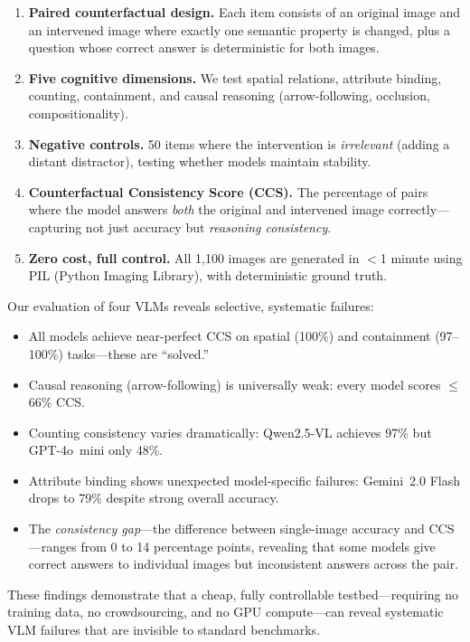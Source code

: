 \documentclass[10pt,twocolumn,letterpaper]{article}
\newcommand{\ccs}{CCS\xspace}
\begin{document}
\begin{enumerate}
\setlength\itemsep{0pt}
\item \textbf{Paired counterfactual design.} Each item consists of an original image and an intervened image where exactly one semantic property is changed, plus a question whose correct answer is deterministic for both images.
\item \textbf{Five cognitive dimensions.} We test spatial relations, attribute binding, counting, containment, and causal reasoning (arrow-following, occlusion, compositionality).
\item \textbf{Negative controls.} 50 items where the intervention is \emph{irrelevant} (adding a distant distractor), testing whether models maintain stability.
\item \textbf{Counterfactual Consistency Score (\ccs).} The percentage of pairs where the model answers \emph{both} the original and intervened image correctly---capturing not just accuracy but \emph{reasoning consistency}.
\item \textbf{Zero cost, full control.} All 1,100 images are generated in $<$1 minute using PIL (Python Imaging Library), with deterministic ground truth.
\end{enumerate}

Our evaluation of four VLMs reveals selective, systematic failures:
\begin{itemize}
\setlength\itemsep{0pt}
\item All models achieve near-perfect \ccs on spatial (100\%) and containment (97--100\%) tasks---these are ``solved.''
\item Causal reasoning (arrow-following) is universally weak: every model scores $\leq$66\% \ccs.
\item Counting consistency varies dramatically: Qwen2.5-VL achieves 97\% but GPT-4o~mini only 48\%.
\item Attribute binding shows unexpected model-specific failures: Gemini~2.0 Flash drops to 79\% despite strong overall accuracy.
\item The \emph{consistency gap}---the difference between single-image accuracy and \ccs---ranges from 0 to 14 percentage points, revealing that some models give correct answers to individual images but inconsistent answers across the pair.
\end{itemize}

These findings demonstrate that a cheap, fully controllable testbed---requiring no training data, no crowdsourcing, and no GPU compute---can reveal systematic VLM failures that are invisible to standard benchmarks.
\end{document}
